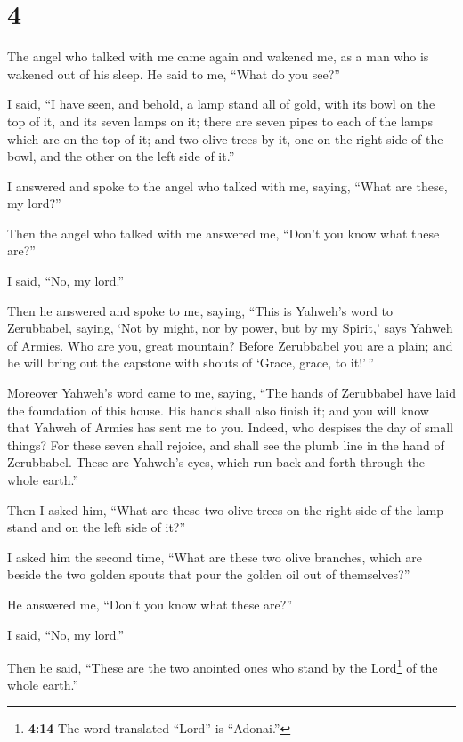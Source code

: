 \hypertarget{section-3}{%
\section{4}\label{section-3}}

 The angel who talked with me came again and wakened me,
as a man who is wakened out of his sleep.  He said to me,
``What do you see?''

I said, ``I have seen, and behold, a lamp stand all of gold, with its
bowl on the top of it, and its seven lamps on it; there are seven pipes
to each of the lamps which are on the top of it;  and two
olive trees by it, one on the right side of the bowl, and the other on
the left side of it.''

 I answered and spoke to the angel who talked with me,
saying, ``What are these, my lord?''

 Then the angel who talked with me answered me, ``Don't
you know what these are?''

I said, ``No, my lord.''

 Then he answered and spoke to me, saying, ``This is
Yahweh's word to Zerubbabel, saying, `Not by might, nor by power, but by
my Spirit,' says Yahweh of Armies.  Who are you, great
mountain? Before Zerubbabel you are a plain; and he will bring out the
capstone with shouts of `Grace, grace, to it!'\,''

 Moreover Yahweh's word came to me, saying, 
``The hands of Zerubbabel have laid the foundation of this house. His
hands shall also finish it; and you will know that Yahweh of Armies has
sent me to you.  Indeed, who despises the day of small
things? For these seven shall rejoice, and shall see the plumb line in
the hand of Zerubbabel. These are Yahweh's eyes, which run back and
forth through the whole earth.''

 Then I asked him, ``What are these two olive trees on
the right side of the lamp stand and on the left side of it?''

 I asked him the second time, ``What are these two olive
branches, which are beside the two golden spouts that pour the golden
oil out of themselves?''

 He answered me, ``Don't you know what these are?''

I said, ``No, my lord.''

 Then he said, ``These are the two anointed ones who
stand by the Lord\footnote{\textbf{4:14} The word translated ``Lord'' is
  ``Adonai.''} of the whole earth.''

